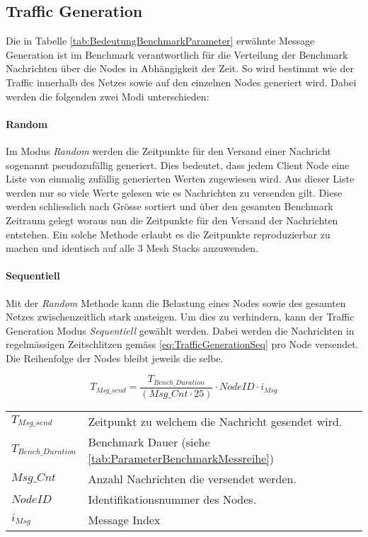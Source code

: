 \subsection{Traffic Generation}\label{subsec:TrafficGeneration}

Die in Tabelle \ref{tab:BedeutungBenchmarkParameter} erwähnte Message Generation ist im Benchmark verantwortlich für die Verteilung der Benchmark Nachrichten über die Nodes in Abhängigkeit der Zeit. So wird bestimmt wie der Traffic innerhalb des Netzes sowie auf den einzelnen Nodes generiert wird.
Dabei werden die folgenden zwei Modi unterschieden:

\paragraph{Random}\label{par:Random}
Im Modus \textit{Random} werden die Zeitpunkte für den Versand einer Nachricht sogenannt pseudozufällig generiert. Dies bedeutet, dass jedem Client Node eine Liste von einmalig zufällig generierten Werten zugewiesen wird.
Aus dieser Liste werden nur so viele Werte gelesen wie es Nachrichten zu versenden gilt. Diese werden schliesslich nach Grösse sortiert und über den gesamten Benchmark Zeitraum gelegt woraus nun die Zeitpunkte für den Versand der Nachrichten entstehen.
Ein solche Methode erlaubt es die Zeitpunkte reproduzierbar zu machen und identisch auf alle 3 Mesh Stacks anzuwenden.

\paragraph{Sequentiell}\label{par:Sequentiell}
Mit der \textit{Random} Methode kann die Belastung eines Nodes sowie des gesamten Netzes zwischenzeitlich stark ansteigen.
Um dies zu verhindern, kann der Traffic Generation Modus \textit{Sequentiell} gewählt werden.
Dabei werden die Nachrichten in regelmässigen Zeitschlitzen gemäss \ref{eq:TrafficGenerationSeq} pro Node versendet. Die Reihenfolge der Nodes bleibt jeweils die selbe.


\begin{equation}\label{eq:TrafficGenerationSeq}
T_{Msg\_send} =  \frac{T_{Bench\_Duration}}{(Msg\_Cnt \cdot 25)} \cdot NodeID \cdot i_{Msg}
\end{equation}

\begin{small}
\begin{center}
\begin{tabular}{ll}
$T_{Msg\_send}$ & Zeitpunkt zu welchem die Nachricht gesendet wird.\\
$T_{Bench\_Duration}$ & Benchmark Dauer (siehe \ref{tab:ParameterBenchmarkMessreihe})\\
$Msg\_Cnt$ & Anzahl Nachrichten die versendet werden.\\
$NodeID$ &Identifikationsnummer des Nodes. \\
$i_{Msg}$ & Message Index
\end{tabular}
\end{center}
\end{small}


